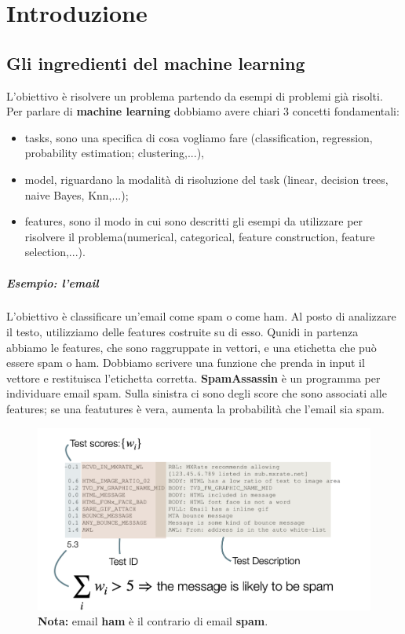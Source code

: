 \chapter{Introduzione}
\section{Gli ingredienti del machine learning}
L'obiettivo è risolvere un problema partendo da esempi di problemi già risolti.
Per parlare di \textbf{machine learning} dobbiamo avere chiari 3 concetti fondamentali:
\begin{itemize}
    \item tasks, sono una specifica di cosa vogliamo fare (classification, regression, probability estimation;
clustering,...),
    \item model, riguardano la modalità di risoluzione del task (linear, decision trees, naive Bayes, Knn,...);
    \item features, sono il modo in cui sono descritti gli esempi da utilizzare per risolvere il problema(numerical, categorical, feature construction,
feature selection,...).
\end{itemize}

\paragraph{Esempio: l'email} 
L'obiettivo è classificare un'email come spam o come ham. Al posto di analizzare il testo, utilizziamo delle features costruite su di esso. 
Qunidi in partenza abbiamo le features, che sono raggruppate in vettori, e una etichetta che può essere spam o ham. Dobbiamo scrivere una funzione che prenda in input il vettore e restituisca l'etichetta corretta.
\textbf{SpamAssassin} è un programma per individuare email spam.
Sulla sinistra ci sono degli score che sono associati alle features; se una featutures è vera, aumenta la probabilità che l'email sia spam.

\begin{figure}
    \centering
    \includegraphics[scale=0.3]{images/spamAssassin.png}
    \caption{\textbf{Nota:} email \textbf{ham} è il contrario di email \textbf{spam}.}
    \label{fig:enter-label}
\end{figure}

